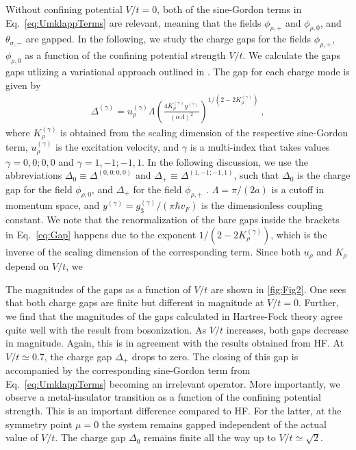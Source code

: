 \documentclass[twocolumn, prl, aps, floatfix, superscriptaddress, longbibliography]{revtex4-1}
\begin{document}
Without confining potential $V/t=0$, both of the sine-Gordon terms in Eq.~\eqref{eq:UmklappTerms} are relevant, meaning that the fields $\phi_{\rho,+}$ and $\phi_{\rho,0}$, and $\theta_{\sigma,-}$ are gapped. In the following, we study the charge gaps for the fields $\phi_{\rho,+}$,  $\phi_{\rho,0}$ as a function of the confining potential strength $V/t$. 
We calculate the gaps gaps utlizing a variational approach outlined in \cite{GiamarchiBook}. The gap for each charge mode is given by
% 
\begin{align} \label{eq:Gap}
	\Delta^{(\gamma)} =  u^{(\gamma)}_{\rho}\Lambda \left(\frac{4K^{(\gamma)}_{\rho} y^{(\gamma)}}{(\alpha\Lambda)^2}\right)^{1/(2-2K^{(\gamma)}_{\rho})} \ , 
\end{align}
%
where $K^{(\gamma)}_{\rho}$ is obtained from the scaling dimension of the respective sine-Gordon term, $u^{(\gamma)}_{\rho}$ is the excitation velocity, and $\gamma$ is a multi-index that takes values $\gamma = 0,0;0,0$ and $\gamma = 1,-1;-1,1$. In the following discussion, we use the abbreviations $\Delta_0 \equiv \Delta^{(0,0;0,0)}$ and $\Delta_+ \equiv \Delta^{(1,-1;-1,1)}$, such that $\Delta_0$ is the charge gap for the field $\phi_{\rho,0}$, and $\Delta_+$ for 
the field $\phi_{\rho,+}$ .  $\Lambda=\pi/(2a)$ is a cutoff in momentum space,  and $y^{(\gamma)} = g_3^{(\gamma)}/(\pi\hbar v_F)$ is the dimensionless coupling constant. We note that the renormalization of the bare gaps  inside the brackets in Eq.~\eqref{eq:Gap} happens due to the exponent $1/(2-2K^{(\gamma)}_{\rho})$, which is the inverse of the scaling dimension of the corresponding term. Since both $u_{\rho}$ and $K_{\rho}$ depend on $V/t$, we 

The magnitudes of the gaps as a function of $V/t$ are shown in \autoref{fig:Fig2}. One sees that both charge gaps are finite but different in magnitude at $V/t=0$. Further, we find that  the magnitudes of the gaps calculated in Hartree-Fock theory agree quite well with the result from bosonization. As $V/t$ increases, both gaps decrease in magnitude. Again, this is in agreement with the results obtained from HF. At $V/t \simeq 0.7$, the charge gap $\Delta_+$ drops to zero. The closing of this gap is accompanied by the corresponding sine-Gordon term from Eq.~\eqref{eq:UmklappTerms} becoming an irrelevant operator. More importantly, we observe a metal-insulator transition as a function of the confining potential strength. This is an important difference compared to HF. For the latter, at the symmetry point $\mu = 0$ the system remains gapped independent of the actual value of $V/t$. The charge gap $\Delta_0$ remains finite all the way up to $V/t\simeq \sqrt{2}$.
\end{document}
